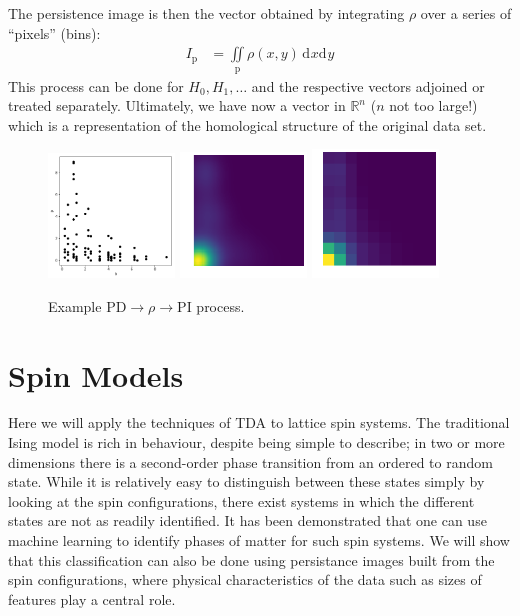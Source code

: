 \documentclass[11pt]{article}
\renewcommand{\d}[2][]{\mathrm{d}^{#1}{#2}}
\begin{document}
The persistence image is then the vector obtained by integrating $\rho$ over a series of ``pixels'' (bins):
\begin{align}
    I_\text{p} &= \iint\limits_\text{p}\rho(x,y)\,\d{x}\d{y}
\end{align}
This process can be done for $H_0,H_1,\ldots$ and the respective vectors adjoined or treated separately. Ultimately, we have now a vector in $\mathbb{R}^n$ ($n$ not too large!) which is a representation of the homological structure of the original data set.

\begin{figure}[b]
    \centering
    \includegraphics[width=0.3\textwidth]{pd_example}
    \includegraphics[width=0.3\textwidth]{rho_example}
    \includegraphics[width=0.3\textwidth]{pi_example}
    \caption{Example PD$\rightarrow\rho\rightarrow$PI process.}
\end{figure}



\section{Spin Models}
Here we will apply the techniques of TDA to lattice spin systems. The traditional Ising model is rich in behaviour, despite being simple to describe; in two or more dimensions there is a second-order phase transition from an ordered to random state. While it is relatively easy to distinguish between these states simply by looking at the spin configurations, there exist systems in which the different states are not as readily identified. It has been demonstrated that one can use machine learning to identify phases of matter for such spin systems. We will show that this classification can also be done using persistance images built from the spin configurations, where physical characteristics of the data such as sizes of features play a central role.
\end{document}
